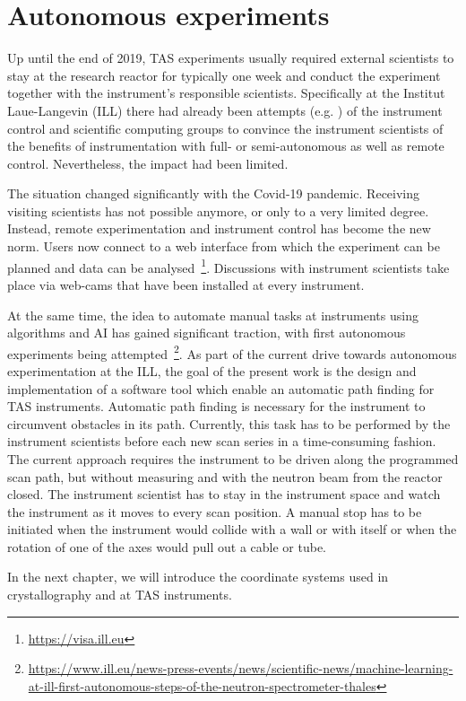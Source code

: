 \section{Autonomous experiments \label{sec:autonomous}}

Up until the end of 2019, TAS experiments usually required external scientists to stay at the research reactor for typically one week and conduct the experiment together with the instrument's responsible scientists. Specifically at the Institut Laue-Langevin (ILL) there had already been attempts (e.g. \cite{Song2020}) of the instrument control and scientific computing groups to convince the instrument scientists of the benefits of instrumentation with full- or semi-autonomous as well as remote control. Nevertheless, the impact had been limited.

The situation changed significantly with the Covid-19 pandemic. Receiving visiting scientists has not possible anymore, or only to a very limited degree. Instead, remote experimentation and instrument control has become the new norm. Users now connect to a web interface from which the experiment can be planned and data can be analysed~\footnote{\url{https://visa.ill.eu}}. Discussions with instrument scientists take place via web-cams that have been installed at every instrument.

At the same time, the idea to automate manual tasks at instruments using algorithms and AI has gained significant traction, with first autonomous experiments being attempted~\footnote{\url{https://www.ill.eu/news-press-events/news/scientific-news/machine-learning-at-ill-first-autonomous-steps-of-the-neutron-spectrometer-thales}}.
As part of the current drive towards autonomous experimentation at the ILL, the goal of the present work is the design and implementation of a software tool which enable an automatic path finding for TAS instruments. Automatic path finding is necessary for the instrument to circumvent obstacles in its path. Currently, this task has to be performed by the instrument scientists before each new scan series in a time-consuming fashion. The current approach requires the instrument to be  driven along the programmed scan path, but without measuring and with the neutron beam from the reactor closed. The instrument scientist has to stay in the instrument space and watch the instrument as it moves to every scan position. A manual stop has to be initiated when the instrument would collide with a wall or with itself or when the rotation of one of the axes would pull out a cable or tube.

In the next chapter, we will introduce the coordinate systems used in crystallography and at TAS instruments.
